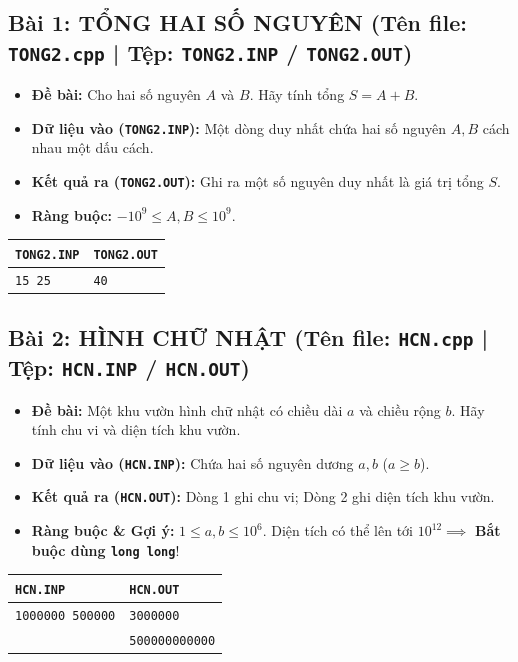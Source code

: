 \documentclass[11pt,a4paper]{article}
\begin{document}
\subsection*{\color{AsianDarkBlue}\small Bài 1: TỔNG HAI SỐ NGUYÊN (Tên file: \texttt{TONG2.cpp} | Tệp: \texttt{TONG2.INP} / \texttt{TONG2.OUT})}
\begin{itemize}
    \setlength{\itemsep}{0.5pt}
    \footnotesize
    \item \textbf{Đề bài:} Cho hai số nguyên $A$ và $B$. Hãy tính tổng $S = A + B$.
    \item \textbf{Dữ liệu vào (\texttt{TONG2.INP}):} Một dòng duy nhất chứa hai số nguyên $A, B$ cách nhau một dấu cách.
    \item \textbf{Kết quả ra (\texttt{TONG2.OUT}):} Ghi ra một số nguyên duy nhất là giá trị tổng $S$.
    \item \textbf{Ràng buộc:} $-10^9 \le A, B \le 10^9$.
\end{itemize}
\vspace{-2mm}
\begin{center}
\footnotesize
\begin{tabular}{|p{7.8cm}|p{7.8cm}|}
\hline
\textbf{\texttt{TONG2.INP}} & \textbf{\texttt{TONG2.OUT}} \\
\hline
\texttt{15 25} & \texttt{40} \\
\hline
\end{tabular}
\end{center}

\vspace{-2mm}
\subsection*{\color{AsianDarkBlue}\small Bài 2: HÌNH CHỮ NHẬT (Tên file: \texttt{HCN.cpp} | Tệp: \texttt{HCN.INP} / \texttt{HCN.OUT})}
\begin{itemize}
    \setlength{\itemsep}{0.5pt}
    \footnotesize
    \item \textbf{Đề bài:} Một khu vườn hình chữ nhật có chiều dài $a$ và chiều rộng $b$. Hãy tính chu vi và diện tích khu vườn.
    \item \textbf{Dữ liệu vào (\texttt{HCN.INP}):} Chứa hai số nguyên dương $a, b$ ($a \ge b$).
    \item \textbf{Kết quả ra (\texttt{HCN.OUT}):} Dòng 1 ghi chu vi; Dòng 2 ghi diện tích khu vườn.
    \item \textbf{Ràng buộc \& Gợi ý:} $1 \le a, b \le 10^6$. Diện tích có thể lên tới $10^{12} \implies$ \textbf{Bắt buộc dùng \texttt{long long}}!
\end{itemize}
\vspace{-2mm}
\begin{center}
\footnotesize
\begin{tabular}{|p{7.8cm}|p{7.8cm}|}
\hline
\textbf{\texttt{HCN.INP}} & \textbf{\texttt{HCN.OUT}} \\
\hline
\texttt{1000000 500000} & \texttt{3000000} \\
& \texttt{500000000000} \\
\hline
\end{tabular}
\end{center}
\end{document}
